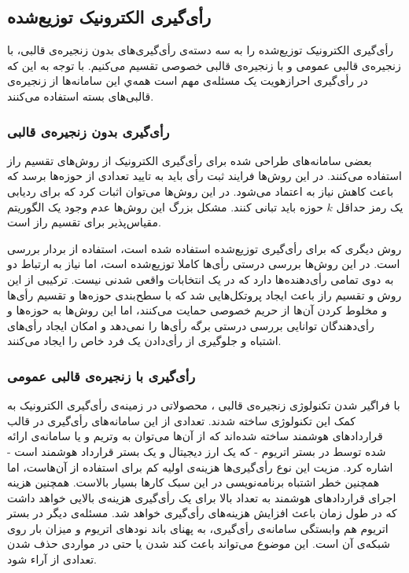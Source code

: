 \subsection{رأی‌گیری الکترونیک توزیع‌شده}
رأی‌گیری الکترونیک توزیع‌شده را به سه دسته‌ی رأی‌گیری‌های بدون زنجیره‌ی قالبی، با زنجیره‌ی قالبی عمومی و با زنجیره‌ی قالبی خصوصی تقسیم می‌کنیم. با توجه به این که در رأی‌گیری احرازهویت یک مسئله‌ی مهم است همه‌ي این سامانه‌ها از زنجیره‌ی قالبی‌های بسته استفاده می‌کنند.
\subsubsection{رأی‌گیری بدون زنجیره‌ی قالبی} 
بعضی سامانه‌های طراحی شده برای رأی‌گیری الکترونیک
\cite{secret1}
\cite{secret2}
\cite{secret3}
از روش‌های تقسیم راز
استفاده می‌کنند. در این روش‌ها فرایند ثبت رأی باید به تایید تعدادی از حوزه‌ها برسد که باعث کاهش نیاز به اعتماد می‌شود. در این روش‌ها می‌توان اثبات کرد که برای ردیابی یک رمز حداقل $k$ حوزه باید تبانی کنند. مشکل بزرگ این روش‌ها عدم وجود یک الگوریتم مقیاس‌پذیر برای تقسیم راز است.
\par
روش دیگری که برای رأی‌گیری توزیع‌شده استفاده شده است، استفاده از بردار‌ بررسی
\cite{checkvector}
است. در این روش‌ها بررسی درستی رأی‌ها کاملا توزیع‌شده‌ است، اما نیاز به ارتباط دو به دوی تمامی رأی‌دهنده‌ها دارد که در یک انتخابات واقعی شدنی نیست. ترکیبی از این روش و تقسیم راز باعث ایجاد پروتکل‌هایی
\cite{MPO1} \cite{evotinwocrypto}
شد که با سطح‌بندی حوزه‌ها و تقسیم رأی‌ها و مخلوط کردن آن‌ها از حریم خصوصی حمایت می‌کنند، اما این روش‌ها به حوزه‌ها و رأی‌دهندگان توانایی بررسی درستی برگه رأی‌ها را نمی‌دهد و امکان ایجاد رأی‌های اشتباه و جلوگیری از رأی‌دادن یک فرد خاص را ایجاد می‌کنند. 


\subsubsection{رأی‌گیری با زنجیره‌ی قالبی عمومی}
با فراگیر شدن تکنولوژی زنجیره‌ی قالبی
\cite{rosgood}
، محصولاتی در زمینه‌ی رأی‌گیری الکترونیک به کمک این تکنولوژی ساخته شدند. تعدادی از این سامانه‌های رأی‌گیری در قالب قرارداد‌های هوشمند
\cite{SmartContract}
ساخته‌ شده‌اند که از آن‌ها می‌توان به وتریم 
\cite{votereum}
و یا سامانه‌ی ارائه شده توسط
\cite{yavuz}
در بستر اتریوم
\cite{Ethereum}
- که یک ارز دیجیتال و یک بستر قرارداد هوشمند است - 
اشاره کرد. مزیت این نوع رأی‌گیری‌ها هزینه‌ی اولیه کم برای استفاده از آن‌هاست، اما همچنین خطر اشتباه برنامه‌نویسی
\cite{surveyAtt}
\cite{gyges} \cite{smart}
در این سبک کارها بسیار بالاست. همچنین هزینه اجرای قراردادهای هوشمند به تعداد بالا برای یک رأی‌گیری هزینه‌ی بالایی خواهد داشت که در طول زمان باعث افزایش هزینه‌های رأی‌گیری خواهد شد. مسئله‌ی دیگر در بستر اتریوم هم وابستگی سامانه‌ی رأی‌گیری، به پهنای باند نود‌های اتریوم و میزان بار روی شبکه‌ی آن است. این موضوع می‌تواند باعث کند شدن یا حتی در مواردی حذف شدن تعدادی از آراء شود.

